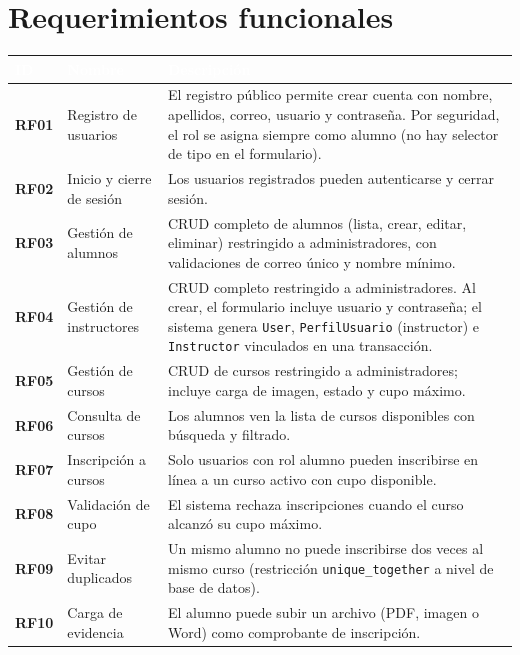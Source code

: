 \documentclass[11pt,letterpaper]{article}
\newcommand{\headrowcolor}{\rowcolor{azulUAZ}}
\newcommand{\headcell}[1]{\textcolor{white}{\textbf{#1}}}
\begin{document}
	\section{Requerimientos funcionales}
	\begin{center}\small
		\begin{longtable}{|>{\bfseries}p{1.1cm}|p{3cm}|p{10.5cm}|}
			\hline
			\headrowcolor \headcell{ID} & \headcell{Nombre} & \headcell{Descripci\'on} \\ \hline \endhead
			RF01 & Registro de usuarios & El registro p\'ublico permite crear cuenta con nombre, apellidos, correo, usuario y contrase\~na. Por seguridad, el rol se asigna siempre como alumno (no hay selector de tipo en el formulario). \\
			 \hline
			\rowcolor{grisAlt}
			RF02 & Inicio y cierre de sesi\'on & Los usuarios registrados pueden autenticarse y cerrar sesi\'on. \\ \hline
			RF03 & Gesti\'on de alumnos & CRUD completo de alumnos (lista, crear, editar, eliminar) restringido a administradores, con validaciones de correo \'unico y nombre m\'inimo. \\ \hline
			\rowcolor{grisAlt}
			RF04 & Gesti\'on de instructores & CRUD completo restringido a administradores. Al crear, el formulario incluye usuario y contrase\~na; el sistema genera \texttt{User}, \texttt{PerfilUsuario} (instructor) e \texttt{Instructor} vinculados en una transacci\'on. \\ \hline
			RF05 & Gesti\'on de cursos & CRUD de cursos restringido a administradores; incluye carga de imagen, estado y cupo m\'aximo. \\ \hline
			\rowcolor{grisAlt}
			RF06 & Consulta de cursos & Los alumnos ven la lista de cursos disponibles con b\'usqueda y filtrado. \\ \hline
			RF07 & Inscripci\'on a cursos & Solo usuarios con rol alumno pueden inscribirse en l\'inea a un curso activo con cupo disponible. \\ \hline
			\rowcolor{grisAlt}
			RF08 & Validaci\'on de cupo & El sistema rechaza inscripciones cuando el curso alcanz\'o su cupo m\'aximo. \\ \hline
			RF09 & Evitar duplicados & Un mismo alumno no puede inscribirse dos veces al mismo curso (restricci\'on \texttt{unique\_together} a nivel de base de datos). \\ \hline
			\rowcolor{grisAlt}
			RF10 & Carga de evidencia & El alumno puede subir un archivo (PDF, imagen o Word) como comprobante de inscripci\'on. \\ \hline

\end{longtable}
\end{center}
\end{document}
